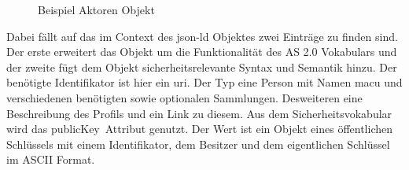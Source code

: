 {\begin{figure}[H]
\begin{minipage}{\textwidth}
			\label{fig:actor}
			\caption{Beispiel Aktoren Objekt}
		\end{minipage}
	\end{figure}
	Dabei fällt auf das im Context des \gls{json-ld} Objektes zwei Einträge zu finden sind. Der erste erweitert das Objekt um die Funktionalität des AS 2.0 Vokabulars und der zweite fügt dem Objekt sicherheitsrelevante Syntax und Semantik hinzu. Der benötigte Identifikator ist hier ein \gls{uri}. Der Typ eine Person mit Namen macu und verschiedenen benötigten sowie optionalen Sammlungen. Desweiteren eine Beschreibung des Profils und ein Link zu diesem. Aus dem Sicherheitsvokabular wird das \glqq publicKey\grqq~Attribut genutzt. Der Wert ist ein Objekt eines öffentlichen Schlüssels mit einem Identifikator, dem Besitzer und dem eigentlichen Schlüssel im ASCII Format.
}
\subsection{
}
